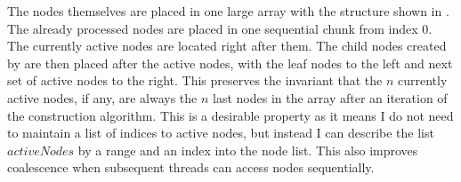 The nodes themselves are placed in one large array with the structure
shown in . The already processed nodes are
placed in one sequential chunk from index 0. The currently active
nodes are located right after them. The child nodes created by
 are then placed after the active
nodes, with the leaf nodes to the left and next set of active nodes to
the right. This preserves the invariant that the $n$ currently active
nodes, if any, are always the $n$ last nodes in the array after an
iteration of the construction algorithm. This is a desirable property
as it means I do not need to maintain a list of indices to active
nodes, but instead I can describe the list $activeNodes$ by a range
and an index into the node list. This also improves coalescence when
subsequent threads can access nodes sequentially.


